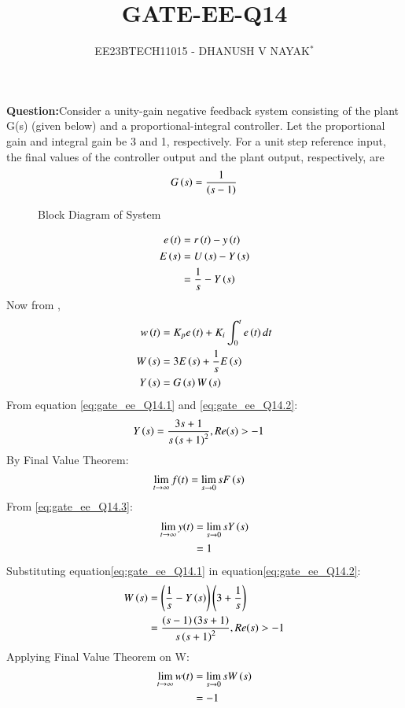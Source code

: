 \documentclass[journal,12pt,twocolumn]{IEEEtran}
\theoremstyle{remark}
\begin{document}

\title{GATE-EE-Q14}
\author{EE23BTECH11015 - DHANUSH V NAYAK$^{*}$%
}
\maketitle
\newpage
\bigskip
\renewcommand{\thefigure}{\arabic{figure}}
\renewcommand{\thetable}{\theenumi}
\textbf{Question:}Consider a unity-gain negative feedback system consisting of the plant G(s) (given below) and a proportional-integral controller. Let the proportional gain and integral
gain be 3 and 1, respectively. For a unit step reference input, the final values of the
controller output and the plant output, respectively, are
\begin{align}
    G\left(s\right) = \frac{1}{\left(s-1\right)} \notag
\end{align}
\solution 

\begin{figure}[H]
    \centering
    
    \caption{Block Diagram of System}
    \label{fig:gate_ee_Q14_blockdiagram}
\end{figure}
\begin{align}
    e\left(t\right) &= r\left(t\right) - y\left(t\right)  \\
    E\left(s\right)&= U\left(s\right) - Y\left(s\right)\\
             &= \frac{1}{s} - Y\left(s\right)\label{eq:gate_ee_Q14.1}
\end{align} 
Now from ,
\begin{align}
    w\left(t\right) &= K_{p}e\left(t\right) + K_{i}\int_{0}^{t}e\left(t\right) dt\\
    W\left(s\right) &= 3E\left(s\right) + \frac{1}{s}E\left(s\right)\label{eq:gate_ee_Q14.2}\\
    Y\left(s\right) &= G\left(s\right)W\left(s\right)
\end{align}
From equation \eqref{eq:gate_ee_Q14.1} and \eqref{eq:gate_ee_Q14.2}:
\begin{align}
    Y\left(s\right) &=  \frac{3s+1}{s\left(s+1\right)^2} ,  Re(s)>-1
\end{align}
By Final Value Theorem:
\begin{align}
    \lim_{t \to \infty} f(t)&= \lim_{s \to 0} sF\left(s\right)\label{eq:gate_ee_Q14.3}
\end{align}
From \eqref{eq:gate_ee_Q14.3}:
\begin{align}
     \lim_{t \to \infty} y(t)&= \lim_{s \to 0} sY\left(s\right)\\
                            &= 1
\end{align}
Substituting equation\eqref{eq:gate_ee_Q14.1} in  equation\eqref{eq:gate_ee_Q14.2}:
\begin{align}
    W\left(s\right) &= \left(\frac{1}{s} - Y\left(s\right)\right)\left(3 + \frac{1}{s}\right)\\
            &= \frac{\left(s-1\right)\left(3s+1\right)}{s\left(s+1\right)^2} ,  Re(s)>-1
\end{align}
Applying Final Value Theorem on W:
\begin{align}
     \lim_{t \to \infty} w(t)&= \lim_{s \to 0} sW\left(s\right)\\
                            &= -1
\end{align}
\end{document}

